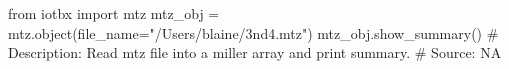 from iotbx import mtz
mtz_obj = mtz.object(file_name="/Users/blaine/3nd4.mtz")
mtz_obj.show_summary()
# Description:  Read mtz file into a miller array and print summary.
# Source:  NA

